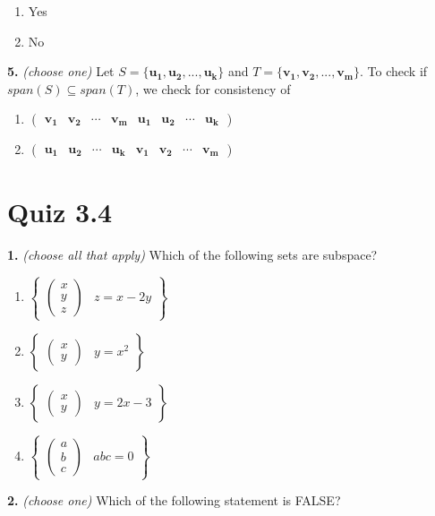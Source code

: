 \documentclass[10pt,a4paper]{article}
\begin{document}
\begin{enumerate}[label=(\Alph*)]
\item Yes
\item No
\end{enumerate}
\smallskip
\textbf{5.} \textit{(choose one)} Let \(S=\{\mathbf{u_1,u_2,...,u_k}\}\) and \(T=\{\mathbf{v_1,v_2,...,v_m}\}\). To check if \(span(S)\subseteq span(T)\), we check for consistency of

\begin{enumerate}[label=(\Alph*)]
\item \(\left(\begin{array}{cccc|cccc}\mathbf{v_1}&\mathbf{v_2}&\cdots&\mathbf{v_m}&\mathbf{u_1}&\mathbf{u_2}&\cdots&\mathbf{u_k}\end{array}\right)\)
\item \(\left(\begin{array}{cccc|cccc}\mathbf{u_1}&\mathbf{u_2}&\cdots&\mathbf{u_k}&\mathbf{v_1}&\mathbf{v_2}&\cdots&\mathbf{v_m}\end{array}\right)\)
\end{enumerate}
\smallskip
\section{Quiz 3.4}
\textbf{1.} \textit{(choose all that apply)} Which of the following sets are subspace?

\begin{enumerate}[label=(\Alph*)]
\item \(\left\{\begin{array}{c|c}\begin{pmatrix}x\\y\\z\end{pmatrix}&z=x-2y\end{array}\right\}\)
\item \(\left\{\begin{array}{c|c}\begin{pmatrix}x\\y\end{pmatrix}&y=x^2\end{array}\right\}\)
\item \(\left\{\begin{array}{c|c}\begin{pmatrix}x\\y\end{pmatrix}&y=2x-3\end{array}\right\}\)
\item \(\left\{\begin{array}{c|c}\begin{pmatrix}a\\b\\c\end{pmatrix}&abc=0\end{array}\right\}\)
\end{enumerate}
\smallskip
\textbf{2.} \textit{(choose one)} Which of the following statement is FALSE?
\end{document}
